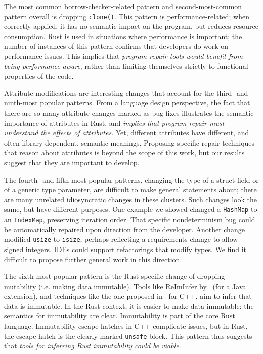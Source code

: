 The most common borrow-checker-related pattern and second-most-common pattern overall is dropping \texttt{clone()}. This pattern is performance-related; when correctly applied, it has no semantic impact on the program, but reduces resource consumption. Rust is used in situations where performance is important; the number of instances of this pattern confirms that developers do work on performance issues. This implies that \emph{program repair tools would benefit from being performance-aware}, rather than limiting themselves strictly to functional properties of the code.

Attribute modifications are interesting changes that account for the third- and ninth-most popular patterns. From a language design perspective, the fact that there are so many attribute changes marked as bug fixes illustrates the semantic importance of attributes in Rust, and \emph{implies that program repair must understand the effects of attributes}. Yet, different attributes have different, and often library-dependent, semantic meanings. Proposing specific repair techniques that reason about attributes is beyond the scope of this work, but our results suggest that they are important to develop.

The fourth- and fifth-most popular patterns, changing the type of a struct field or of a generic type parameter, are difficult to make general statements about; there are many unrelated idiosyncratic changes in these clusters. Such changes look the same, but have different purposes. One example we showed changed a \texttt{HashMap} to an \texttt{IndexMap}, preserving iteration order. That specific nondeterminism bug could be automatically repaired upon direction from the developer. Another change modified \texttt{usize} to \texttt{isize}, perhaps reflecting a requirements change to allow signed integers. IDEs could support refactorings that modify types. We find it difficult to propose further general work in this direction.

The sixth-most-popular pattern is the Rust-specific change of dropping mutability (i.e. making data immutable). Tools like ReImInfer by~\cite{HuangMDE2012} (for a Java extension), and techniques like the one proposed in~\cite{EyolfsonAbstractImmutability} for C++, aim to infer that data is immutable. In the Rust context, it is easier to make data immutable: the semantics for immutability are clear. Immutability is part of the core Rust language. Immutability escape hatches in C++ complicate issues, but in Rust, the escape hatch is the clearly-marked \texttt{unsafe} block. This pattern thus suggests that \emph{tools for inferring Rust immutability could be viable}.

